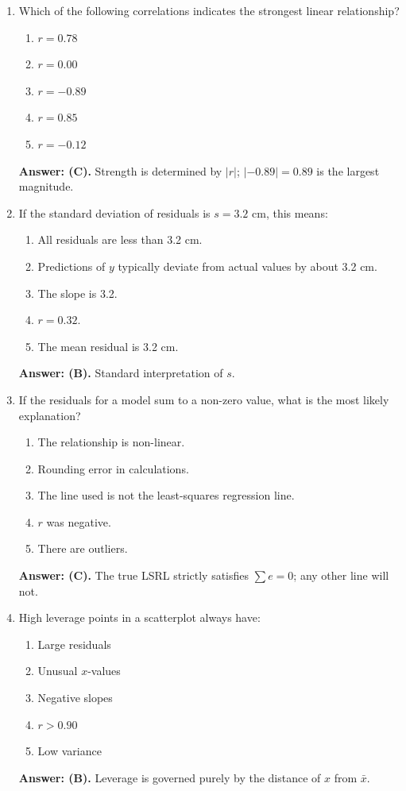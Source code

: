 \begin{enumerate}[resume, leftmargin=1.5em]
  \item Which of the following correlations indicates the strongest linear relationship?
  \begin{enumerate}[label=(\Alph*)]
    \item $r = 0.78$ \item $r = 0.00$ \item $r = -0.89$ \item $r = 0.85$ \item $r = -0.12$
  \end{enumerate}
  \textbf{Answer: (C).} Strength is determined by $|r|$; $|-0.89| = 0.89$ is the largest magnitude.

  \item If the standard deviation of residuals is $s = 3.2\text{ cm}$, this means:
  \begin{enumerate}[label=(\Alph*)]
    \item All residuals are less than 3.2 cm.
    \item Predictions of $y$ typically deviate from actual values by about 3.2 cm.
    \item The slope is 3.2.
    \item $r = 0.32$.
    \item The mean residual is 3.2 cm.
  \end{enumerate}
  \textbf{Answer: (B).} Standard interpretation of $s$.

  \item If the residuals for a model sum to a non-zero value, what is the most likely explanation?
  \begin{enumerate}[label=(\Alph*)]
    \item The relationship is non-linear.
    \item Rounding error in calculations.
    \item The line used is not the least-squares regression line.
    \item $r$ was negative.
    \item There are outliers.
  \end{enumerate}
  \textbf{Answer: (C).} The true LSRL strictly satisfies $\sum e = 0$; any other line will not.

  \item High leverage points in a scatterplot always have:
  \begin{enumerate}[label=(\Alph*)]
    \item Large residuals \item Unusual $x$-values \item Negative slopes \item $r > 0.90$ \item Low variance
  \end{enumerate}
  \textbf{Answer: (B).} Leverage is governed purely by the distance of $x$ from $\bar{x}$.


\end{enumerate}

